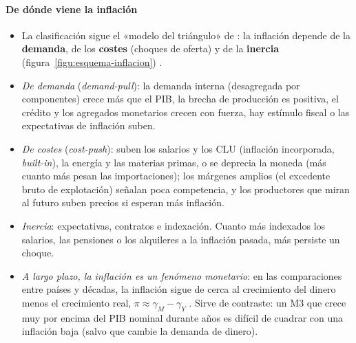 \documentclass[11pt]{article}
\begin{document}
\paragraph{De dónde viene la inflación}
\begin{itemize}
\item La clasificación sigue el «modelo del triángulo» de \textcite{Gordon2011Phillips}: la inflación depende de la \textbf{demanda}, de los \textbf{costes} (choques de oferta) y de la \textbf{inercia} (figura~\ref{figu:esquema-inflacion}) .
\item \emph{De demanda} (\emph{demand-pull}): la demanda interna (desagregada por componentes) crece más que el PIB, la brecha de producción es positiva, el crédito y los agregados monetarios crecen con fuerza, hay estímulo fiscal o las expectativas de inflación suben.
\item \emph{De costes} (\emph{cost-push}): suben los salarios y los CLU (inflación incorporada, \emph{built-in}), la energía y las materias primas, o se deprecia la moneda (más cuanto más pesan las importaciones); los márgenes amplios (el excedente bruto de explotación) señalan poca competencia, y los productores que miran al futuro suben precios si esperan más inflación.
\item \emph{Inercia}: expectativas, contratos e indexación. Cuanto más indexados los salarios, las pensiones o los alquileres a la inflación pasada, más persiste un choque.
\item \emph{A largo plazo, la inflación es un fenómeno monetario}: en las comparaciones entre países y décadas, la inflación sigue de cerca al crecimiento del dinero menos el crecimiento real, $\pi\approx\gamma_M-\gamma_Y$ \parencite{McCandlessWeber1995}. Sirve de contraste: un M3 que crece muy por encima del PIB nominal durante años es difícil de cuadrar con una inflación baja (salvo que cambie la demanda de dinero).
\end{itemize}

\begin{infografia}[!htb]
\centering
\caption{De dónde viene la inflación: el triángulo de }\label{figu:esquema-inflacion}
\end{infografia}
\end{document}
